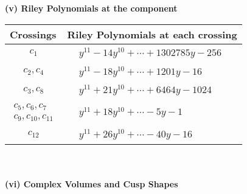 \documentclass[1p]{elsarticle_modified}
\theoremstyle{definition}
\begin{document}
\newpage\renewcommand{\arraystretch}{1}
\flushleft \textbf{(v) Riley Polynomials at the component}\newline \\
\begin{tabular}{m{50pt}|m{274pt}}
Crossings & \hspace{64pt}Riley Polynomials at each crossing \\
\hline $$\begin{aligned}c_{1}\end{aligned}$$&$\begin{aligned}
&y^{11}-14 y^{10}+\cdots+1302785 y-256
\end{aligned}$\\
\hline $$\begin{aligned}c_{2},c_{4}\end{aligned}$$&$\begin{aligned}
&y^{11}-18 y^{10}+\cdots+1201 y-16
\end{aligned}$\\
\hline $$\begin{aligned}c_{3},c_{8}\end{aligned}$$&$\begin{aligned}
&y^{11}+21 y^{10}+\cdots+6464 y-1024
\end{aligned}$\\
\hline $$\begin{aligned}c_{5},c_{6},c_{7}\\c_{9},c_{10},c_{11}\end{aligned}$$&$\begin{aligned}
&y^{11}+18 y^{10}+\cdots-5 y-1
\end{aligned}$\\
\hline $$\begin{aligned}c_{12}\end{aligned}$$&$\begin{aligned}
&y^{11}+26 y^{10}+\cdots-40 y-16
\end{aligned}$\\
\hline
\end{tabular}\\~\\
\newpage\flushleft \textbf{(vi) Complex Volumes and Cusp Shapes}
\end{document}
